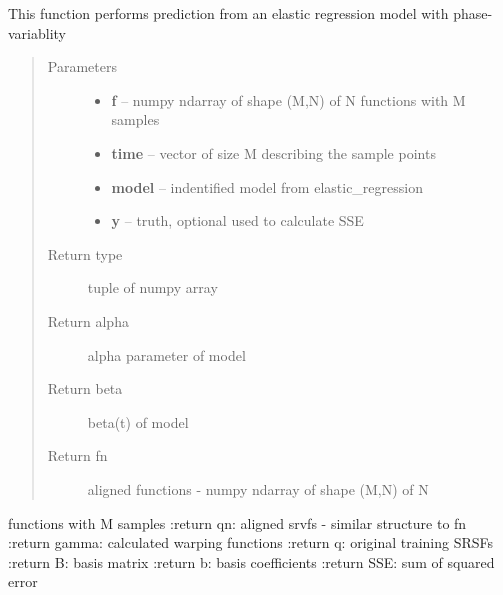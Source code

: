 \documentclass[letterpaper,10pt,english]{sphinxmanual}
\begin{document}

\begin{fulllineitems}
\label{regression:regression.elastic_prediction}
This function performs prediction from an elastic regression model
with phase-variablity
\begin{quote}\begin{description}
\item[{Parameters}] \leavevmode\begin{itemize}
\item {} 
\textbf{f} -- numpy ndarray of shape (M,N) of N functions with M samples

\item {} 
\textbf{time} -- vector of size M describing the sample points

\item {} 
\textbf{model} -- indentified model from elastic\_regression

\item {} 
\textbf{y} -- truth, optional used to calculate SSE

\end{itemize}

\item[{Return type}] \leavevmode
tuple of numpy array

\item[{Return alpha}] \leavevmode
alpha parameter of model

\item[{Return beta}] \leavevmode
beta(t) of model

\item[{Return fn}] \leavevmode
aligned functions - numpy ndarray of shape (M,N) of N

\end{description}\end{quote}

functions with M samples
:return qn: aligned srvfs - similar structure to fn
:return gamma: calculated warping functions
:return q: original training SRSFs
:return B: basis matrix
:return b: basis coefficients
:return SSE: sum of squared error

\end{fulllineitems}

\end{document}
